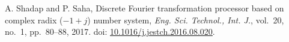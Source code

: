 \begin{thebibliography}{99}
    A. Shadap and P. Saha,
    Discrete Fourier transformation processor based on complex radix ($-1+j$) number system,
    \textit{Eng. Sci. Technol., Int. J.},
    vol.~20, no.~1, pp.~80--88, 2017.
    doi: \href{https://doi.org/10.1016/j.jestch.2016.08.020}{10.1016/j.jestch.2016.08.020}.
\end{thebibliography}